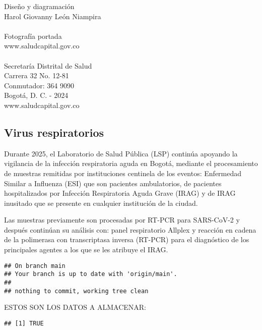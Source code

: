 \documentclass[
]{article}
\begin{document}
\begin{center}
{\color{colortitles} Diseño y diagramación\\}
Harol Giovanny León Niampira\\~\\


{\color{colortitles} Fotografía portada\\}
www.saludcapital.gov.co\\~\\


{\color{colortitles}
Secretaría Distrital de Salud\\
Carrera 32 No. 12-81\\
Conmutador: 364 9090\\
Bogotá, D. C. - 2024\\
www.saludcapital.gov.co\\}
\end{center}


\newpage

\begin{flushleft}
{\color{colortitles} \section{Virus respiratorios}}
\end{flushleft}

Durante 2025, el Laboratorio de Salud Pública (LSP) continúa apoyando la
vigilancia de la infección respiratoria aguda en Bogotá, mediante el
procesamiento de muestras remitidas por instituciones centinela de los
eventos: Enfermedad Similar a Influenza (ESI) que son pacientes
ambulatorios, de pacientes hospitalizados por Infección Respiratoria
Aguda Grave (IRAG) y de IRAG inusitado que se presente en cualquier
institución de la ciudad.

Las muestras previamente son procesadas por RT-PCR para SARS-CoV-2 y
después continúan su análisis con: panel respiratorio Allplex y reacción
en cadena de la polimerasa con transcriptasa inversa (RT-PCR) para el
diagnóstico de los principales agentes a los que se les atribuye el
IRAG.

\begin{verbatim}
## On branch main
## Your branch is up to date with 'origin/main'.
## 
## nothing to commit, working tree clean
\end{verbatim}

ESTOS SON LOS DATOS A ALMACENAR:

\begin{verbatim}
## [1] TRUE
\end{verbatim}
\end{document}
